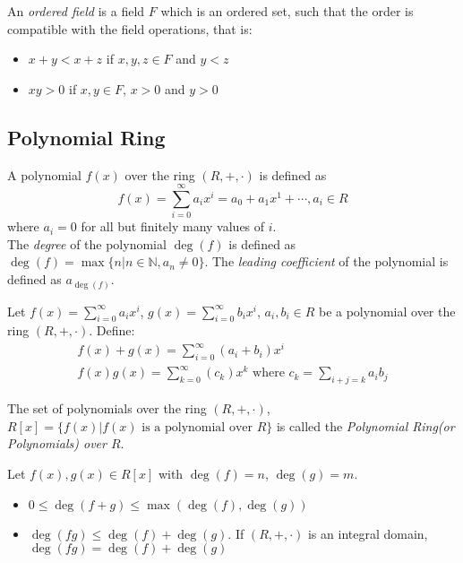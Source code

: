 \documentclass{report}
\begin{document}
		\begin{defn} \label{def_ordered_field}
			An \emph{ordered field} is a field $F$ which is an ordered set, such that the order is compatible with the field operations, that is:
			\begin{itemize}
				\item $x+y<x+z$ if $x,y,z \in F$ and $y<z$
				\item $xy>0$ if $x,y \in F$, $x>0$ and $y>0$
			\end{itemize}
			\end{defn}
	
		\subsection{Polynomial Ring}
		\begin{defn} \label{def_polynomial}
			A polynomial $f(x)$ over the ring $(R,+,\cdot)$ is defined as
			\begin{displaymath}
				f(x)=\sum_{i=0}^{\infty}a_ix^i=a_0+a_1x^1+\cdots,a_i\in R
			\end{displaymath}
			where $a_i=0$ for all but finitely many values of $i$.\\
			The \emph{degree} of the polynomial $\deg(f)$ is defined as $\deg(f)=\max\{n|n\in\mathbb{N}, a_n\ne0 \}$.
			The \emph{leading coefficient} of the polynomial is defined as $a_{\deg(f)}$.
		\end{defn}

		\begin{defn} \label{def_add_mult_polynomial}
			Let $f(x)=\sum_{i=0}^{\infty}a_ix^i$, $g(x)=\sum_{i=0}^{\infty}b_ix^i$, $a_i,b_i \in R$ be a polynomial over the ring $(R,+,\cdot)$. Define:
			\begin{gather*}
				f(x)+g(x)=\sum_{i=0}^{\infty}(a_i+b_i)x^i\\
				f(x)g(x)=\sum_{k=0}^{\infty}(c_k)x^k \text{ where } c_k=\sum_{i+j=k}a_ib_j
			\end{gather*}
		\end{defn}

		\begin{defn} \label{def_polynomial_ring}
			The set of polynomials over the ring $(R,+,\cdot)$, $R[x]=\{f(x)|f(x) \text{ is a polynomial over } R \}$ is called the \emph{Polynomial Ring(or Polynomials) over $R$}.
		\end{defn}

		\begin{thm} \label{thm_add_mult_deg}
			Let $f(x),g(x) \in R[x]$ with $\deg(f)=n$, $\deg(g)=m$.
			\begin{itemize}
				\item $0 \le \deg(f+g) \le \max(\deg(f),\deg(g))$
				\item $\deg(fg) \le \deg(f)+\deg(g)$.
				\subitem If $(R,+,\cdot)$ is an integral domain, $\deg(fg) = \deg(f)+\deg(g)$
			\end{itemize}
		\end{thm}
\end{document}
